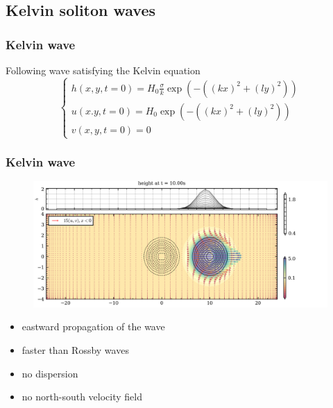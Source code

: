 \documentclass[numbering=fraction]{beamer}
\begin{document}
\subsection{Kelvin soliton waves}
\begin{frame}
    \frametitle{Kelvin wave}
    Following wave satisfying the Kelvin equation
    \begin{equation}
        \label{eq:Kelvin wave}
        \begin{cases}
            h(x,y,t = 0) = H_0  \frac{\sigma}{k} \exp(- ((kx) ^2 +(ly)^ 2)) \\
            u(x.y, t = 0) = H_0 \exp(- ((kx) ^2 +(ly)^ 2))                  \\
            v(x,y,t=0) = 0
        \end{cases}
    \end{equation}
\end{frame}
\begin{frame}
    \frametitle{Kelvin wave}
    \begin{figure}[H]
        \centering
        \includegraphics[width=\textwidth]{./figure/kelvin_wave.png}
    \end{figure}
    \begin{itemize}
        \item eastward propagation of the wave
        \item faster than Rossby waves
        \item no dispersion
        \item no north-south velocity field
    \end{itemize}
\end{frame}
\end{document}
